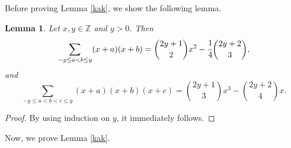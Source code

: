 \documentclass[12pt]{amsart}
\newtheorem{lemma}[theorem]{Lemma}
\theoremstyle{definition}
\theoremstyle{remark}
\numberwithin{equation}{section}
\def\NZQ{\mathbb}               %
\def\ZZ{{\NZQ Z}}
\begin{document}
Before proving Lemma \ref{kak}, we show the following lemma.
\begin{lemma}
	\label{poly}
	Let $x,y \in \ZZ$ and $y>0$.
	Then
	$$\sum\limits_{-y\leq a<b \leq y}(x+a)(x+b)=\binom{2y+1}{2}x^2-\cfrac{1}{4}\binom{2y+2}{3},$$
	and
	$$\sum\limits_{-y\leq a<b<c \leq y}(x+a)(x+b)(x+c)=\binom{2y+1}{3}x^3-\binom{2y+2}{4}x.$$
	
\end{lemma}
\begin{proof}
	By using induction on $y$, it immediately follows.
\end{proof}
Now, we prove Lemma \ref{kak}.
\end{document}
